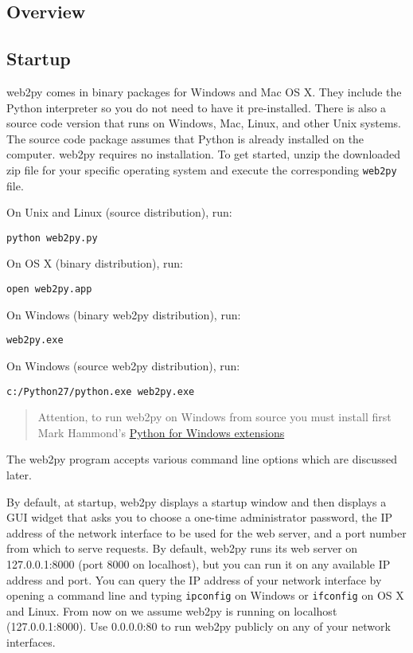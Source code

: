 \documentclass[justified,sixbynine,notoc]{tufte-book}
\def\ft{\small\tt}
\def\inxx#1{\index{#1}}
\begin{document}
\begin{fullwidth}
\goodbreak\chapter{Overview}

\goodbreak\section{Startup}

\inxx{Linux} \inxx{Mac} \inxx{Windows}
\noindent web2py comes in binary packages for Windows and Mac OS X. They include the Python interpreter so you do not need to have it pre-installed. There is also a source code version that runs on Windows, Mac, Linux, and other Unix systems. The source code package assumes that Python is already installed on the computer.
\noindent web2py requires no installation. To get started, unzip the downloaded zip file for your specific operating system and execute the corresponding {\ft web2py} file.

On Unix and Linux (source distribution), run:
\begin{lstlisting}
python web2py.py
\end{lstlisting}

On OS X (binary distribution), run:
\begin{lstlisting}
open web2py.app
\end{lstlisting}

On Windows (binary web2py distribution), run:
\begin{lstlisting}
web2py.exe
\end{lstlisting}

On Windows (source web2py distribution), run:
\begin{lstlisting}
c:/Python27/python.exe web2py.exe
\end{lstlisting}

\begin{quote}Attention, to run web2py on Windows from source you must install first Mark Hammond's {\footnotesize\href{http://sourceforge.net/projects/pywin32/}{Python for Windows extensions}}\end{quote}
The web2py program accepts various command line options which are discussed later.

By default, at startup, web2py displays a startup window and then displays a GUI widget that asks you to choose a one-time administrator password, the IP address of the network interface to be used for the web server, and a port number from which to serve requests. By default, web2py runs its web server on 127.0.0.1:8000 (port 8000 on localhost), but you can run it on any available IP address and port. You can query the IP address of your network interface by opening a command line and typing {\ft ipconfig} on Windows or {\ft ifconfig} on OS X and Linux. From now on we assume web2py is running on localhost (127.0.0.1:8000). Use 0.0.0.0:80 to run web2py publicly on any of your network interfaces.



\end{fullwidth}
\end{document}
